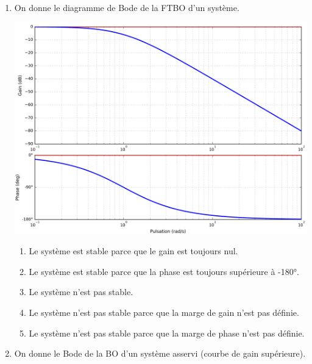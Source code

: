\documentclass[10pt,fleqn]{article} %
\begin{document}
\begin{multicols}{2}
\begin{enumerate}
\begin{enumerate}
système d'ordre 1 est toujours stable.
\item Le système est stable parce que c'est un système d'ordre 2 et qu'un
système d'ordre 2 est toujours stable.
\item Le système est stable parce que c'est comme ça et puis c'est tout.
\item On ne peut pas savoir sur ce tracé.
\end{enumerate}
\item On donne le diagramme de Bode de la FTBO d'un système.
\begin{center}
\includegraphics[width=\linewidth]{images/Bode_01}
\end{center}
\begin{enumerate}
\item Le système est stable parce que le gain est toujours nul.
\item Le système est stable parce que la phase est toujours supérieure à
-180°.
\item Le système n'est pas stable.
\item Le système n'est pas stable parce que la marge de gain n'est pas
définie.
\item Le système n'est pas stable parce que la marge de phase n'est pas définie.
\end{enumerate}
\item On donne le Bode de la BO d'un système asservi (courbe de gain supérieure).
\begin{center}

\end{center}
\end{enumerate}
\end{multicols}
\end{document}
